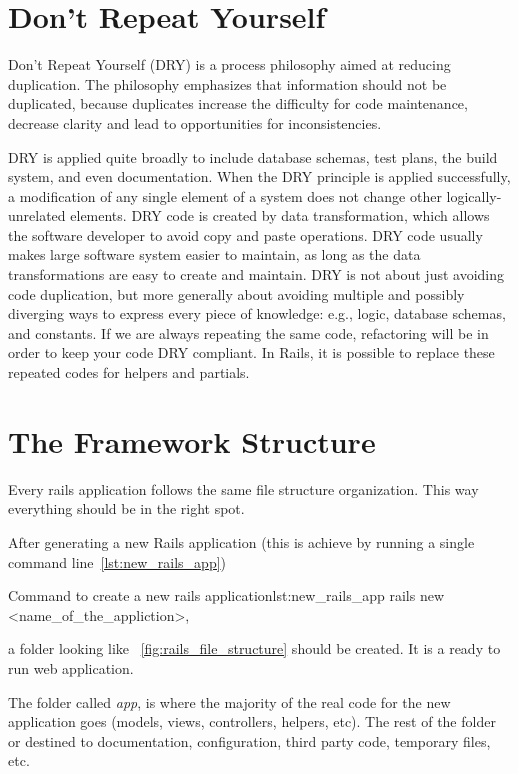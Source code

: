 \section{Don’t Repeat Yourself} 
Don’t Repeat Yourself (DRY) is a process philosophy aimed at reducing duplication. 
The philosophy emphasizes that information should not be duplicated, 
because duplicates increase the difficulty for code maintenance, 
decrease clarity and lead to opportunities for inconsistencies.

DRY is applied quite broadly to include database schemas, 
test plans, the build system, and even documentation. 
When the DRY principle is applied successfully, 
a modification of any single element of a system does not change other logically-unrelated elements.
DRY code is created by data transformation, which allows the software developer to avoid copy and paste operations.
DRY code usually makes large software system easier to maintain, 
as long as the data transformations are easy to create and maintain.
DRY is not about just avoiding code duplication, 
but more generally about avoiding multiple and possibly diverging ways to express every piece of knowledge: 
e.g., logic, database schemas, and constants.
If we are always repeating the same code, 
refactoring will be in order to keep your code DRY compliant. 
In Rails, it is possible to replace these repeated codes for helpers and partials.



\section{The Framework Structure} 
Every rails application follows the same file structure organization. 
This way everything should be in the right spot.

After generating a new Rails application (this is achieve by running a single command line~\ref{lst:new_rails_app}) 

\begin{rubycode}{Command to create a new rails application}{lst:new_rails_app}
  rails new <name\_of\_the\_appliction>,

\end{rubycode}
a folder looking like ~\ref{fig:rails_file_structure} should be created. 
It is a ready to run web application.

The folder called \emph{app}, 
is where the majority of the real code for the new application goes (models, views, controllers, helpers, etc).
The rest of the folder or destined to documentation, configuration, third party code, temporary files, etc.

